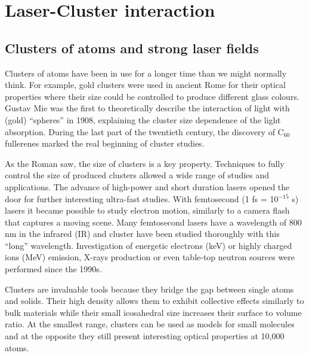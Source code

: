 
\section{Laser-Cluster interaction}

\subsection{Clusters of atoms and strong laser fields}
Clusters of atoms have been in use for a longer time than we might normally
think. For example, gold clusters were used in ancient Rome for their optical
properties where their size could be controlled to produce different glass colours.
Gustav Mie was the first to theoretically describe the interaction of light
with (gold) ``spheres'' in 1908, explaining the cluster size dependence of the
light absorption. During the last part of the twentieth century, the discovery of
C$_{60}$ fullerenes marked the real beginning of cluster studies.

As the Roman saw, the size of clusters is a key property. Techniques to fully
control the size of produced clusters allowed a wide range of studies and
applications. The advance of high-power and short duration lasers opened the
door for further interesting ultra-fast studies. With femtosecond
(1 fs = 10$^{-15}$ s) lasers it became possible to study electron motion,
similarly to a camera flash that captures a moving scene. Many femtosecond lasers
have a wavelength of 800 nm in the infrared (IR) and cluster have been studied
thoroughly with this ``long'' wavelength. Investigation of energetic
electrons (keV) or highly charged ions (MeV) emission, X-rays production or even
table-top neutron sources\cite{Krainov2007} were performed since the
1990s\cite{Haberland1994,Brabec2009}.

Clusters are invaluable tools because they bridge the gap between single atoms
and solids. Their high density allows them to exhibit collective effects similarly
to bulk materials while their small icosahedral\cite{Martin1996} size increases
their surface to volume ratio.
At the smallest range, clusters can be used as models for small molecules and
at the opposite they still present interesting optical properties at 10,000
atoms\cite{Reinhard2004}.

